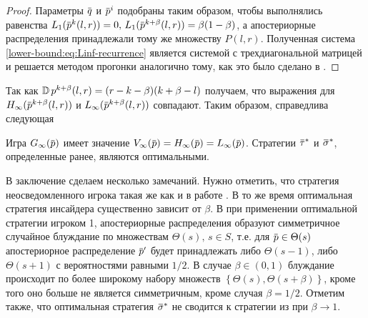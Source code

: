 {\begin{proof}
  Параметры $\q$ и $\p^i$ подобраны таким образом, чтобы выполнялись равенства %
  $\Low[1](\p^k(l,r)) = 0, \, \Low[1](\p^{k+\beta}(l,r)) = \beta(1-\beta)$, а
  апостериорные распределения принадлежали тому же множеству $P(l,r)$.
  Полученная система \eqref{lower-bound:eq:Linf-recurrence} является системой с
  трехдиагональной матрицей и решается методом прогонки аналогично тому, как это
  было сделано в \cite{pyanykh16:discr:ru}.
\end{proof}

Так как $\operatorname{\mathbb{D}} p^{k+\beta}(l, r) = (r-k-\beta)(k+\beta-l)$ получаем, что выражения
для $\High(\p^{k+\beta}(l,r))$ и $\Low(\p^{k+\beta}(l,r))$ совпадают. Таким
образом, справедлива следующая
\begin{theorem}
  \label{solution:theorem}
  Игра $\theGame[\infty](\p)$ имеет значение $\V[\infty](\p) = \High(\p) = \Low(\p)$.
  Стратегии $\tauv^*$ и $\sigmav^*$, определенные ранее, являются оптимальными.
\end{theorem}

В заключение сделаем несколько замечаний. Нужно отметить, что стратегия
неосведомленного игрока такая же как и в работе \cite{domansky07}. В то же
время оптимальная стратегия инсайдера существенно зависит от $\beta$. В
\cite{domansky11} при применении оптимальной стратегии игроком 1,
апостериорные распределения образуют симметричное случайное блуждание по
множествам $\Theta(s), \, s \in S$, т.е. для $\p \in \Theta(s)$ апостериорное
распределение $\p'$ будет принадлежать либо $\Theta(s-1)$, либо $\Theta(s+1)$ с
вероятностями равными $1/2$. В случае $\beta \in (0, 1)$ блуждание происходит по
более широкому набору множеств %
$\left\{ \Theta(s), \Theta(s+\beta) \right \}$, %
кроме того оно больше не является симметричным, кроме случая $\beta = 1/2$.
Отметим также, что оптимальная стратегия $\sigmav^*$ не сводится к стратегии из
\cite{domansky11} при $\beta \rightarrow 1$.

\clearpage
}

